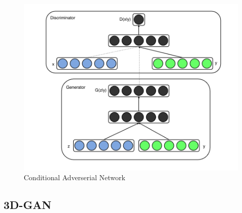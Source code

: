 \documentclass{llncs}
\begin{document}
\begin{figure}[htbp] 
	\centering
	\includegraphics[width=1.2\textwidth]{cgan.png}
	\caption{Conditional Adverserial Network}
	\label{fig:Bild20}
\end{figure}

\subsection{3D-GAN}
\end{document}

